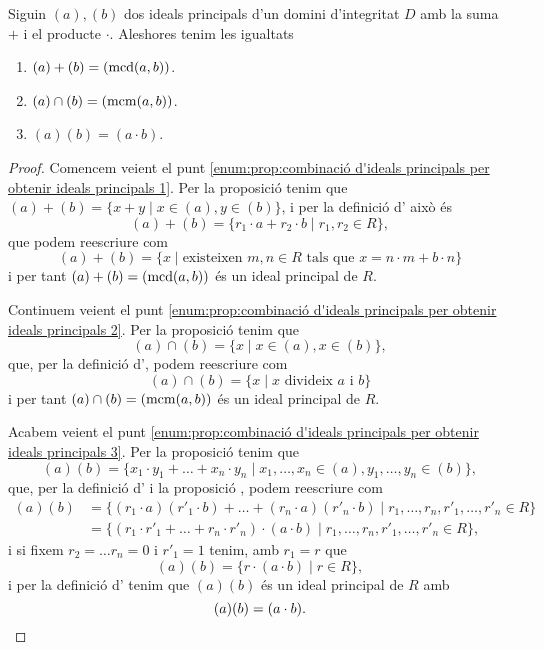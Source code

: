 \documentclass[../../Main.tex]{subfiles}
\begin{document}
	\begin{proposition}
		\label{prop:combinació d'ideals principals per obtenir ideals principals}
		Siguin \((a),(b)\) dos ideals principals d'un domini d'integritat \(D\) amb la suma \(+\) i el producte \(\cdot\). Aleshores tenim les igualtats
		\begin{enumerate}
			\item\label{enum:prop:combinació d'ideals principals per obtenir ideals principals 1} \((a)+(b)=(\operatorname{mcd}(a,b))\).
			\item\label{enum:prop:combinació d'ideals principals per obtenir ideals principals 2} \((a)\cap(b)=(\operatorname{mcm}(a,b))\).
			\item\label{enum:prop:combinació d'ideals principals per obtenir ideals principals 3} \((a)(b)=(a\cdot b)\).
		\end{enumerate}
		\begin{proof}%
			Comencem veient el punt \eqref{enum:prop:combinació d'ideals principals per obtenir ideals principals 1}. Per la proposició  tenim que \((a)+(b)=\{x+y\mid x\in(a),y\in(b)\}\), i per la definició d' això és
			\[(a)+(b)=\{r_{1}\cdot a+r_{2}\cdot b\mid r_{1},r_{2}\in R\},\]
			que podem reescriure com
			\[(a)+(b)=\{x\mid\text{existeixen }m,n\in R\text{ tals que }x=n\cdot m+b\cdot n\}\]
			i per tant \((a)+(b)=(\operatorname{mcd}(a,b))\) és un ideal principal de \(R\). %
			
			Continuem veient el punt \eqref{enum:prop:combinació d'ideals principals per obtenir ideals principals 2}. Per la proposició  tenim que
			\[(a)\cap(b)=\{x\mid x\in(a),x\in(b)\},\]
			que, per la definició d', podem reescriure com
			\[(a)\cap(b)=\{x\mid x\text{ divideix }a\text{ i }b\}\]
			i per tant \((a)\cap(b)=(\operatorname{mcm}(a,b))\) és un ideal principal de \(R\). %
			
			Acabem veient el punt \eqref{enum:prop:combinació d'ideals principals per obtenir ideals principals 3}. Per la proposició  tenim que
			\[(a)(b)=\{x_{1}\cdot y_{1}+\dots+x_{n}\cdot y_{n}\mid x_{1},\dots,x_{n}\in(a),y_{1},\dots,y_{n}\in(b)\},\]
			que, per la definició d' i la proposició , podem reescriure com
			\begin{align*}
			(a)(b)&=\{(r_{1}\cdot a)(r'_{1}\cdot b)+\dots+(r_{n}\cdot a)(r'_{n}\cdot b)\mid r_{1},\dots,r_{n},r'_{1},\dots,r'_{n}\in R\}\\
			&=\{(r_{1}\cdot r'_{1}+\dots+r_{n}\cdot r'_{n})\cdot(a\cdot b)\mid r_{1},\dots,r_{n},r'_{1},\dots,r'_{n}\in R\},
			\end{align*}
			i si fixem \(r_{2}=\dots r_{n}=0\) i \(r'_{1}=1\) tenim, amb \(r_{1}=r\) que
			\[(a)(b)=\{r\cdot(a\cdot b)\mid r\in R\},\]
			i per la definició d' tenim que \((a)(b)\) és un ideal principal de \(R\) amb
			\[(a)(b)=(a\cdot b).\qedhere\]
		\end{proof}
	\end{proposition}
\end{document}
